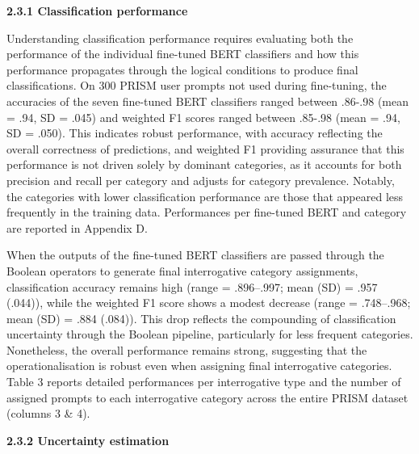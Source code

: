 \documentclass[
  12pt,
]{article}
\begin{document}
\textbf{2.3.1 Classification performance}

Understanding classification performance requires evaluating both the performance of the individual fine-tuned BERT classifiers and how this performance propagates through the logical conditions to produce final classifications. On 300 PRISM user prompts not used during fine-tuning, the accuracies of the seven fine-tuned BERT classifiers ranged between .86-.98 (mean = .94, SD = .045) and weighted F1 scores ranged between .85-.98 (mean = .94, SD = .050). This indicates robust performance, with accuracy reflecting the overall correctness of predictions, and weighted F1 providing assurance that this performance is not driven solely by dominant categories, as it accounts for both precision and recall per category and adjusts for category prevalence. Notably, the categories with lower classification performance are those that appeared less frequently in the training data. Performances per fine-tuned BERT and category are reported in Appendix D.

When the outputs of the fine-tuned BERT classifiers are passed through the Boolean operators to generate final interrogative category assignments, classification accuracy remains high (range = .896--.997; mean (SD) = .957 (.044)), while the weighted F1 score shows a modest decrease (range = .748--.968; mean (SD) = .884 (.084)). This drop reflects the compounding of classification uncertainty through the Boolean pipeline, particularly for less frequent categories. Nonetheless, the overall performance remains strong, suggesting that the operationalisation is robust even when assigning final interrogative categories. Table 3 reports detailed performances per interrogative type and the number of assigned prompts to each interrogative category across the entire PRISM dataset (columns 3 \& 4).

\textbf{2.3.2 Uncertainty estimation}
\end{document}
